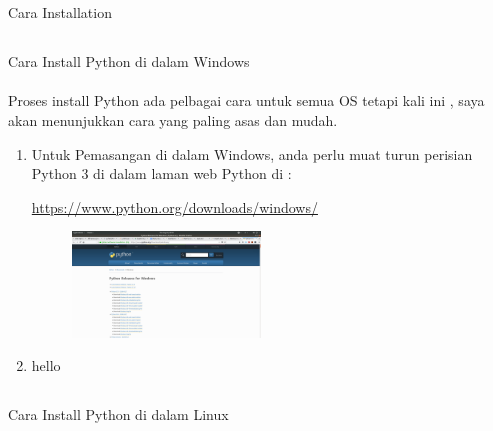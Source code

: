 \section{}
Cara Installation
\subsection{}
Cara Install Python di dalam Windows

\paragraph{}
Proses install Python ada pelbagai cara untuk semua OS tetapi kali ini , saya akan menunjukkan cara yang paling asas dan mudah.

\begin{enumerate}
	\item  Untuk Pemasangan di dalam Windows, anda perlu muat turun perisian Python 3 di dalam laman web Python di : 

	\url{https://www.python.org/downloads/windows/}

	\begin{figure}
		\includegraphics[width=5cm]{./img/1.png}
	\end{figure}

	\item hello
\end{enumerate}

\subsection{}
Cara Install Python di dalam Linux
